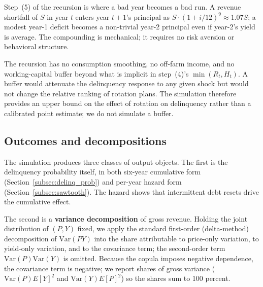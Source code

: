 \documentclass[11pt,letterpaper]{article}
\theoremstyle{remark}
\begin{document}
Step~(5) of the recursion is where a bad year becomes a bad run. A revenue shortfall of $S$ in year $t$ enters year $t+1$'s principal as $S \cdot (1 + i/12)^{9} \approx 1.07 S$; a modest year-1 deficit becomes a non-trivial year-2 principal even if year-2's yield is average. The compounding is mechanical; it requires no risk aversion or behavioral structure.
 
The recursion has no consumption smoothing, no off-farm income, and no working-capital buffer beyond what is implicit in step~(4)'s $\min(R_t, H_t)$. A buffer would attenuate the delinquency response to any given shock but would not change the relative ranking of rotation plans. The simulation therefore provides an upper bound on the effect of rotation on delinquency rather than a calibrated point estimate; we do not simulate a buffer.
 
\subsection{\label{subsec:decompositions}Outcomes and decompositions}
 
The simulation produces three classes of output objects. The first is the delinquency probability itself, in both six-year cumulative form (Section~\ref{subsec:delinq_prob}) and per-year hazard form (Section~\ref{subsec:sawtooth}). The hazard shows that intermittent debt resets drive the cumulative effect.
 
The second is a \textbf{variance decomposition} of gross revenue. Holding the joint distribution of $(P, Y)$ fixed, we apply the standard first-order (delta-method) decomposition of $\text{Var}(P Y)$ into the share attributable to price-only variation, to yield-only variation, and to the covariance term; the second-order term $\text{Var}(P)\text{Var}(Y)$ is omitted. Because the copula imposes negative dependence, the covariance term is negative; we report shares of gross variance ($\text{Var}(P) E[Y]^2$ and $\text{Var}(Y) E[P]^2$) so the shares sum to 100 percent.
 
\end{document}
